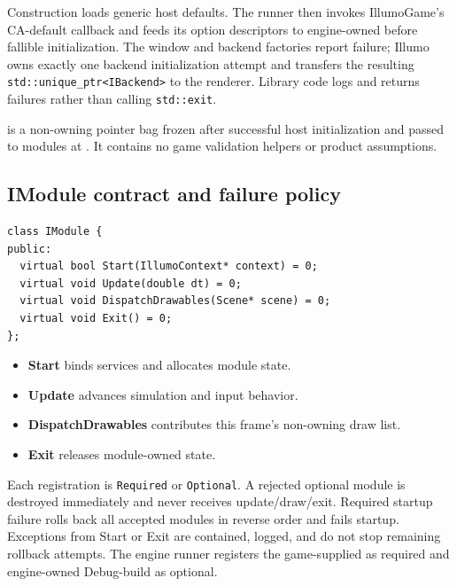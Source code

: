 Construction loads generic host defaults. The runner then invokes IllumoGame's
CA-default callback and feeds its option descriptors to engine-owned
 before fallible initialization. The window and backend
factories report failure; Illumo owns exactly one backend initialization attempt
and transfers the resulting \texttt{std::unique\_ptr<IBackend>} to the renderer.
Library code logs and returns failures rather than calling \texttt{std::exit}.

 is a non-owning pointer bag frozen after successful
host initialization and passed to modules at . It contains no
game validation helpers or product assumptions.

\subsection{IModule contract and failure policy}
\begin{lstlisting}
class IModule {
public:
  virtual bool Start(IllumoContext* context) = 0;
  virtual void Update(double dt) = 0;
  virtual void DispatchDrawables(Scene* scene) = 0;
  virtual void Exit() = 0;
};
\end{lstlisting}

\begin{itemize}
  \item \textbf{Start} binds services and allocates module state.
  \item \textbf{Update} advances simulation and input behavior.
  \item \textbf{DispatchDrawables} contributes this frame's non-owning draw list.
  \item \textbf{Exit} releases module-owned state.
\end{itemize}

Each registration is \texttt{Required} or \texttt{Optional}. A rejected optional
module is destroyed immediately and never receives update/draw/exit. Required
startup failure rolls back all accepted modules in reverse order and fails
startup. Exceptions from Start or Exit are contained, logged, and do not stop
remaining rollback attempts. The engine runner registers the game-supplied
 as required and engine-owned Debug-build
 as optional.

